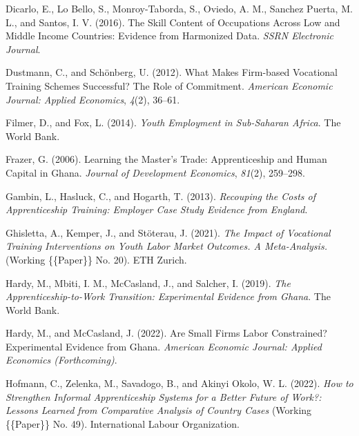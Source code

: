 \documentclass[
  11pt,
a4paper
]{report}
\newlength{\cslhangindent}
\newenvironment{CSLReferences}[2] %
 {%
  \setlength{\parindent}{0pt}
  \ifodd #1 \everypar{\setlength{\hangindent}{\cslhangindent}}\ignorespaces\fi
  \ifnum #2 > 0
  \setlength{\parskip}{#2\baselineskip}
  \fi
 }%
 {}
\begin{document}
\begin{CSLReferences}{1}{0}
\leavevmode{}%
Dicarlo, E., Lo Bello, S., Monroy-Taborda, S., Oviedo, A. M., Sanchez Puerta, M. L., and Santos, I. V. (2016). The {Skill Content} of {Occupations Across Low} and {Middle Income Countries}: {Evidence} from {Harmonized Data}. \emph{SSRN Electronic Journal}.

\leavevmode{}%
Dustmann, C., and Schönberg, U. (2012). What {Makes Firm-based Vocational Training Schemes Successful}? {The Role} of {Commitment}. \emph{American Economic Journal: Applied Economics}, \emph{4}(2), 36--61.

\leavevmode{}%
Filmer, D., and Fox, L. (2014). \emph{Youth {Employment} in {Sub-Saharan Africa}}. {The World Bank}.

\leavevmode{}%
Frazer, G. (2006). Learning the {Master}'s {Trade}: {Apprenticeship} and {Human Capital} in {Ghana}. \emph{Journal of Development Economics}, \emph{81}(2), 259--298.

\leavevmode{}%
Gambin, L., Hasluck, C., and Hogarth, T. (2013). \emph{Recouping the {Costs} of {Apprenticeship Training}: {Employer Case Study Evidence} from {England}}.

\leavevmode{}%
Ghisletta, A., Kemper, J., and Stöterau, J. (2021). \emph{The {Impact} of {Vocational Training Interventions} on {Youth Labor Market Outcomes}. {A Meta-Analysis}.} (Working \{\{Paper\}\} No. 20). {ETH Zurich}.

\leavevmode{}%
Hardy, M., Mbiti, I. M., McCasland, J., and Salcher, I. (2019). \emph{The {Apprenticeship-to-Work Transition}: {Experimental Evidence} from {Ghana}}. {The World Bank}.

\leavevmode{}%
Hardy, M., and McCasland, J. (2022). Are {Small Firms Labor Constrained}? {Experimental Evidence} from {Ghana}. \emph{American Economic Journal: Applied Economics (Forthcoming)}.

\leavevmode{}%
Hofmann, C., Zelenka, M., Savadogo, B., and Akinyi Okolo, W. L. (2022). \emph{How to {Strengthen Informal Apprenticeship Systems} for a {Better Future} of {Work}?: {Lessons Learned} from {Comparative Analysis} of {Country Cases}} (Working \{\{Paper\}\} No. 49). {International Labour Organization}.


\end{CSLReferences}
\end{document}
